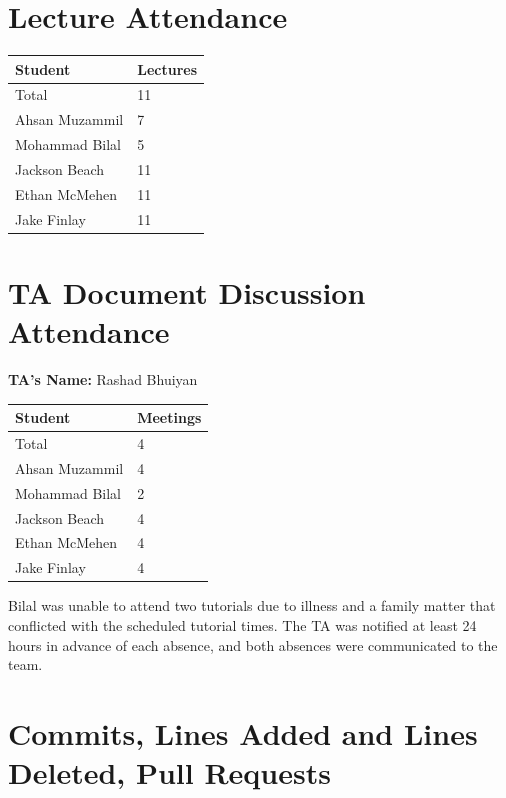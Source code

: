 \documentclass[10pt, titlepage]{article}
\begin{document}
\section{Lecture Attendance}
\begin{table}[H]
\centering
\begin{tabular}{ll}
\toprule
\textbf{Student} & \textbf{Lectures}\\
\midrule
Total & 11 \\
Ahsan Muzammil & 7 \\
Mohammad Bilal & 5 \\
Jackson Beach & 11 \\
Ethan McMehen & 11 \\
Jake Finlay & 11 \\
\bottomrule
\end{tabular}
\end{table}

\section{TA Document Discussion Attendance}
\noindent \textbf{TA's Name: } Rashad Bhuiyan

\begin{table}[H]
\centering
\begin{tabular}{ll}
\toprule
\textbf{Student} & \textbf{Meetings}\\
\midrule
Total & 4 \\
Ahsan Muzammil & 4 \\
Mohammad Bilal & 2 \\
Jackson Beach & 4 \\
Ethan McMehen & 4 \\
Jake Finlay & 4 \\
\bottomrule
\end{tabular}
\end{table}


Bilal was unable to attend two tutorials due to illness
and a family matter that conflicted with the scheduled
tutorial times. The TA was notified at least 24 hours
in advance of each absence, and both absences were
communicated to the team.


\section{Commits, Lines Added and Lines Deleted, Pull Requests}
\end{document}
